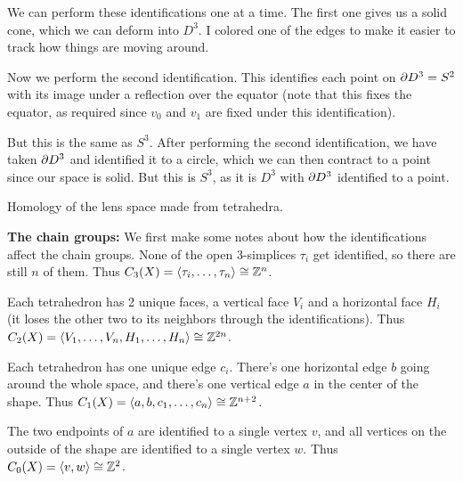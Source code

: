 \documentclass[twoside,10pt]{article}
\begin{document}
We can perform these identifications one at a time. The first one gives us a solid cone, which we can deform into $D^{3}$. I colored one of the edges to make it easier to track how things are moving around.

\vspace{2in}

Now we perform the second identification. This identifies each point on $\partial D^{3} = S^{2}$ with its image under a reflection over the equator (note that this fixes the equator, as required since $v_0$ and $v_1$ are fixed under this identification).

\newpage

But this is the same as $S^{3}$. After performing the second identification, we have taken $\partial D^{3}$ and identified it to a circle, which we can then contract to a point since our space is solid. But this is $S^{3}$, as it is $D^{3}$ with $\partial D^{3}$ identified to a point.

\newpage

\begin{exer}[2.1: 8]
Homology of the lens space made from tetrahedra.
\end{exer}

\textbf{The chain groups:} We first make some notes about how the identifications affect the chain groups. None of the open 3-simplices $\tau_i$ get identified, so there are still $n$ of them. Thus $C_3(X) = \langle \tau_i, \dots, \tau_n \rangle \cong \mathbb{Z}^{n}$.

\vspace{1.5in}

Each tetrahedron has 2 unique faces, a vertical face $V_i$ and a horizontal face $H_i$ (it loses the other two to its neighbors through the identifications). Thus $C_2(X) = \langle V_1,\dots,V_n,H_1,\dots,H_n \rangle\cong \mathbb{Z}^{2n}$.

\vspace{1.5in}

Each tetrahedron has one unique edge $c_i$. There's one horizontal edge $b$ going around the whole space, and there's one vertical edge $a$ in the center of the shape. Thus $C_1(X) = \langle a,b,c_1,\dots,c_n \rangle\cong \mathbb{Z}^{n+2}$.

\vspace{1.5in}

The two endpoints of $a$ are identified to a single vertex $v$, and all vertices on the outside of the shape are identified to a single vertex $w$. Thus $C_0(X) = \langle v,w \rangle\cong \mathbb{Z}^{2}$.
\end{document}
